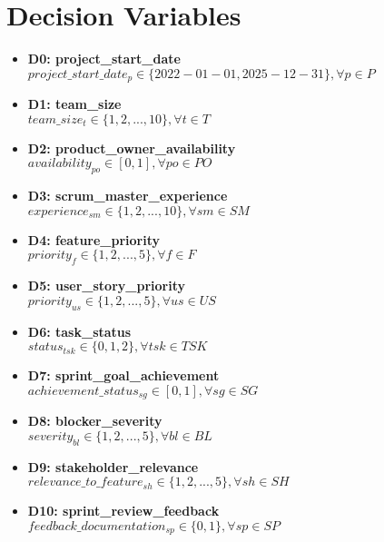 \documentclass{article}
\begin{document}
\section{Decision Variables}
\begin{itemize}
    \item \textbf{D0: project\_start\_date} \\
    $project\_start\_date_p \in \{2022-01-01, 2025-12-31\}, \forall p \in P$

    \item \textbf{D1: team\_size} \\
    $team\_size_t \in \{1, 2, ..., 10\}, \forall t \in T$

    \item \textbf{D2: product\_owner\_availability} \\
    $availability_{po} \in [0, 1], \forall po \in PO$

    \item \textbf{D3: scrum\_master\_experience} \\
    $experience_{sm} \in \{1, 2, ..., 10\}, \forall sm \in SM$

    \item \textbf{D4: feature\_priority} \\
    $priority_f \in \{1, 2, ..., 5\}, \forall f \in F$

    \item \textbf{D5: user\_story\_priority} \\
    $priority_{us} \in \{1, 2, ..., 5\}, \forall us \in US$

    \item \textbf{D6: task\_status} \\
    $status_{tsk} \in \{0, 1, 2\}, \forall tsk \in TSK$

    \item \textbf{D7: sprint\_goal\_achievement} \\
    $achievement\_status_{sg} \in [0, 1], \forall sg \in SG$

    \item \textbf{D8: blocker\_severity} \\
    $severity_{bl} \in \{1, 2, ..., 5\}, \forall bl \in BL$

    \item \textbf{D9: stakeholder\_relevance} \\
    $relevance\_to\_feature_{sh} \in \{1, 2, ..., 5\}, \forall sh \in SH$

    \item \textbf{D10: sprint\_review\_feedback} \\
    $feedback\_documentation_{sp} \in \{0, 1\}, \forall sp \in SP$


\end{itemize}
\end{document}
